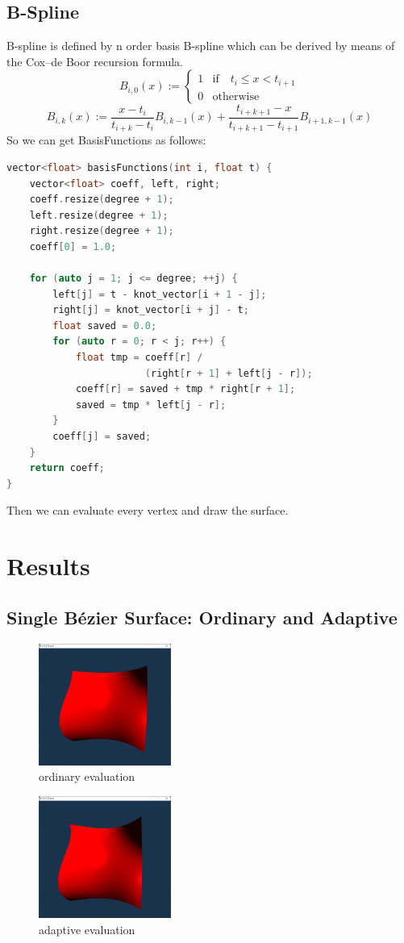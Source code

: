 \documentclass[acmtog]{acmart}
\begin{document}
\subsection{B-Spline}
B-spline is defined by n order basis B-spline which can be derived by means of the Cox–de Boor recursion formula.
$$
    B_{i,0}(x):=\left\{{\begin{matrix}1&\mathrm {if} \quad t_{i}\leq x<t_{i+1}\\0&\mathrm {otherwise} \end{matrix}}\right.
$$
$$
    B_{i,k}(x):={\frac {x-t_{i}}{t_{i+k}-t_{i}}}B_{i,k-1}(x)+{\frac {t_{i+k+1}-x}{t_{i+k+1}-t_{i+1}}}B_{i+1,k-1}(x)
$$
So we can get BasisFunctions as follows:
\begin{lstlisting}[language=C++]
vector<float> basisFunctions(int i, float t) {
    vector<float> coeff, left, right;
    coeff.resize(degree + 1);
    left.resize(degree + 1);
    right.resize(degree + 1);
    coeff[0] = 1.0;

    for (auto j = 1; j <= degree; ++j) {
        left[j] = t - knot_vector[i + 1 - j];
        right[j] = knot_vector[i + j] - t;
        float saved = 0.0;
        for (auto r = 0; r < j; r++) {
            float tmp = coeff[r] /
                        (right[r + 1] + left[j - r]);
            coeff[r] = saved + tmp * right[r + 1];
            saved = tmp * left[j - r];
        }
        coeff[j] = saved;
    }
    return coeff;
}
\end{lstlisting}
Then we can evaluate every vertex and draw the surface.

\section{Results}
\subsection{Single Bézier Surface: Ordinary and Adaptive}
\begin{figure}[h]
    \centering
    \includegraphics[height = 4.0cm]{ordinary_object.png}
    \caption{ordinary evaluation}
\end{figure}
\begin{figure}[h]
    \centering
    \includegraphics[height = 4.0cm]{adaptive_object.png}
    \caption{adaptive evaluation}
\end{figure}
\end{document}
